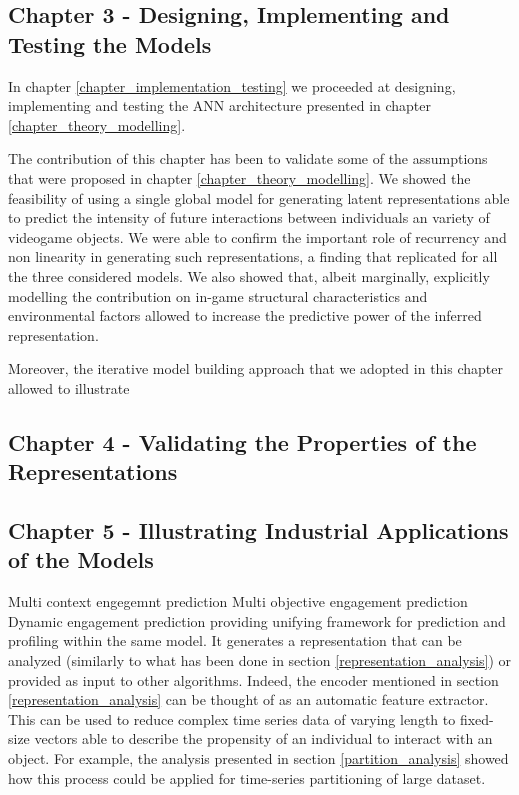 \subsection{Chapter 3 - Designing, Implementing and Testing the Models }
\label{discussion_chapter_three}
In chapter \ref{chapter_implementation_testing} we proceeded at designing, implementing and testing the ANN architecture presented in chapter \ref{chapter_theory_modelling}.

The contribution of this chapter has been to validate some of the assumptions that were proposed in chapter \ref{chapter_theory_modelling}. 
We showed the feasibility of using a single global model for generating latent representations able to predict the intensity of future interactions between individuals an variety of videogame objects. We were able to confirm the important role of recurrency and non linearity in generating such representations, a finding that replicated for all the three considered models. We also showed that, albeit marginally, explicitly modelling the contribution on in-game structural characteristics and environmental factors allowed to increase the predictive power of the inferred representation. 

Moreover, the iterative model building approach that we adopted in this chapter allowed to illustrate 

\subsection{Chapter 4 - Validating the Properties of the Representations}
\label{discussion_chapter_four}


\subsection{Chapter 5 - Illustrating Industrial Applications of the Models}
\label{discussion_chapter_five}

Multi context engegemnt prediction
Multi objective engagement prediction
Dynamic engagement prediction
providing unifying framework for prediction and profiling within the same model.
It generates a representation that can be analyzed (similarly to what has been done in section \ref{representation_analysis}) or provided as input to other algorithms. Indeed, the encoder mentioned in section \ref{representation_analysis} can be thought of as an automatic feature extractor. This can be used to reduce complex time series data of varying length to fixed-size vectors able to describe the propensity of an individual to interact with an object. For example, the analysis presented in section \ref{partition_analysis} showed how this process could be applied for time-series partitioning of large dataset.


